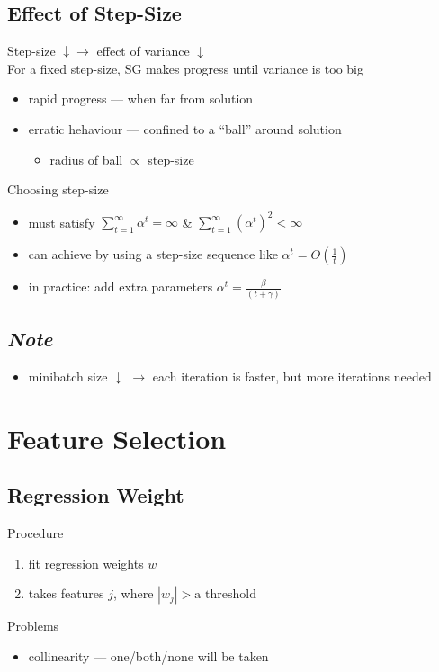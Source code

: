 \documentclass[10pt,landscape,a4paper]{article}
\begin{document}
\begin{multicols*}{5}
\subsection{Effect of Step-Size}
Step-size \(\downarrow \rightarrow \) effect of variance \(\downarrow \) \\
For a fixed step-size, SG makes progress until variance is too big
\begin{itemize}
    \item rapid progress --- when far from solution
    \item erratic hehaviour --- confined to a ``ball'' around solution
    \begin{itemize}
        \item radius of ball \(\propto \) step-size
    \end{itemize}
\end{itemize}
Choosing step-size
\begin{itemize}
    \item must satisfy \(\sum_{t=1}^{\infty} \alpha^t = \infty\) \& \(\sum_{t=1}^{\infty} (\alpha^t)^2 < \infty\)
    \item can achieve by using a step-size sequence like \(\alpha^t = O(\frac{1}{t})\)
    \item in practice: add extra parameters \(\alpha^t = \frac{\beta}{(t+\gamma)}\)
\end{itemize}

\subsection{\emph{Note}}
\begin{itemize}
    \item minibatch size \(\downarrow \) \(\rightarrow \) each iteration is faster, but more iterations needed
\end{itemize}

\section{Feature Selection}

\subsection{Regression Weight}
Procedure
\begin{enumerate}
    \item fit regression weights \(w\)
    \item takes features \(j\), where \(|w_j| > \text{a threshold }\)
\end{enumerate}
Problems
\begin{itemize}
    \item collinearity --- one/both/none will be taken
\end{itemize}


\end{multicols*}
\end{document}
